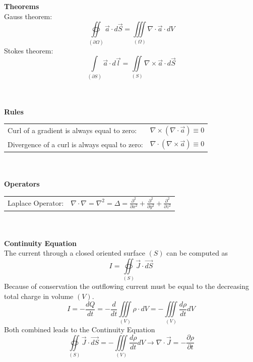 \textbf{\\ \\ Theorems\\}
	Gauss theorem:
	\begin{equation*}
		\oiint\limits_{\left(\partial \Omega\right)} \vec{a} \cdot d\vec{S} = \iiint\limits_{\left(\Omega\right)} \nabla \cdot \vec{a} \cdot dV
	\end{equation*}
	Stokes theorem:
	\begin{equation*}
		\int\limits_{\left(\partial S\right)} \vec{a} \cdot d\vec{l} = \iint\limits_{\left(S\right)} \nabla \times \vec{a} \cdot d\vec{S}
	\end{equation*}
	
\textbf{\\ \\ Rules \\}
\begin{tabular}{ll}
	Curl of a gradient is always equal to zero: & \(\displaystyle \nabla \times \left(\nabla \cdot \vec{a} \right) \equiv 0\) \\
	Divergence of a curl is always equal to zero: & \(\displaystyle \nabla \cdot \left(\nabla \times \vec{a}\right) \equiv 0 \)\\
\end{tabular}

\textbf{\\ \\ Operators \\} 
\begin{tabular}{ll}
	Laplace Operator: & \(\displaystyle \nabla \cdot \nabla = \nabla^2 = \Delta = \frac{\partial^2}{\partial x^2}+\frac{\partial^2}{\partial y^2}+\frac{\partial^2}{\partial z^2} \) \\
\end{tabular}
	
\textbf{\\ \\Continuity Equation\\}
	The current through a closed oriented surface $(S)$ can be computed as
	\begin{equation*}
		I = \oiint\limits_{\left(S\right)} \vec{J} \cdot \vec{dS}
	\end{equation*}
	Because of conservation the outflowing current must be equal to the decreasing total charge in volume $(V)$.
	\begin{equation*}
		I = -\frac{dQ}{dt} = -\frac{d}{dt}\iiint\limits_{\left(V\right)} \rho \cdot dV = -\iiint\limits_{\left(V\right)} \frac{d \rho}{dt}dV
	\end{equation*}
	Both combined leads to the Continuity Equation
	\begin{equation*}
		\oiint\limits_{\left(S\right)} \vec{J} \cdot \vec{dS} = - \iiint\limits_{\left(V\right)} \frac{d\rho}{dt}dV \rightarrow \nabla \cdot \vec{J} = -\frac{\partial \rho}{\partial t}
	\end{equation*}

